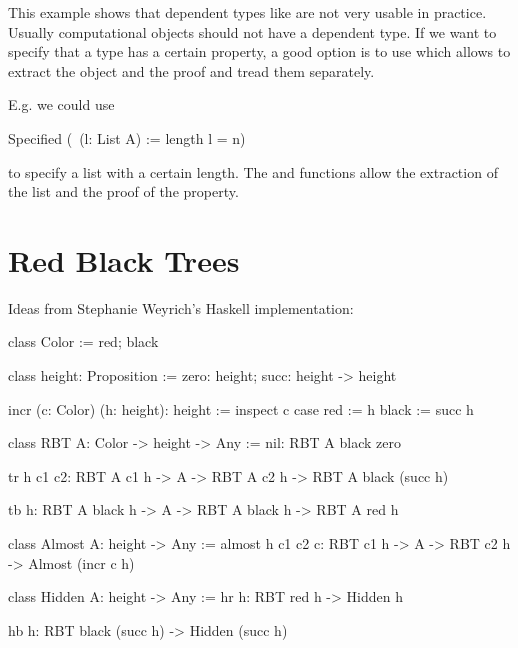 This example shows that dependent types like  are not very usable
in practice. Usually computational objects should not have a dependent type. If
we want to specify that a type has a certain property, a good option is to use
 which allows to extract the object and the proof and tread them
separately.

\noindent E.g. we could use
\begin{alba}
    Specified (\ (l: List A) := length l = n)
\end{alba}
%
to specify a list with a certain length. The  and 
functions allow the extraction of the list and the proof of the property.






\section{Red Black Trees}

Ideas from Stephanie Weyrich's Haskell implementation:

\begin{alba}
    class Color := red; black

    class height: Proposition := zero: height; succ: height -> height


    incr (c: Color) (h: height): height :=
        inspect c case
            red := h
            black := succ h

    class
        RBT A: Color -> height -> Any
    :=
        nil: RBT A black zero

        tr h c1 c2: RBT A c1 h -> A -> RBT A c2 h -> RBT A black (succ h)

        tb h: RBT A black h -> A -> RBT A black h -> RBT A red h


    class
        Almost A: height -> Any
    :=
        almost h c1 c2 c: RBT c1 h -> A -> RBT c2 h -> Almost (incr c h)

    class
        Hidden A: height -> Any
    :=
        hr h: RBT red h -> Hidden h

        hb h: RBT black (succ h) -> Hidden (succ h)
\end{alba}











